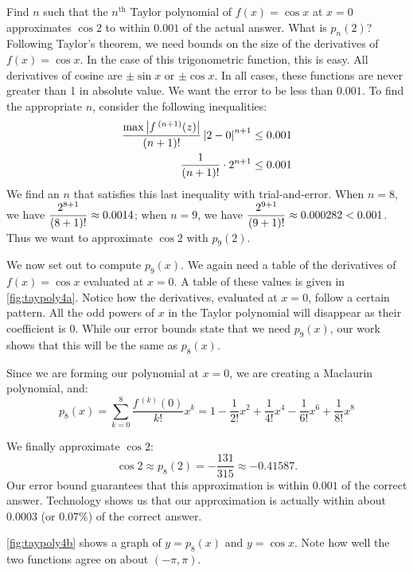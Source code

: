 \begin{example}\label{ex_taypoly4}%
Find $n$ such that the $n^{\text{th}}$ Taylor polynomial of $f(x)=\cos x$ at $x=0$ approximates $\cos 2$ to within $0.001$ of the actual answer. What is $p_n(2)$?
\solution
Following Taylor's theorem, we need bounds on the size of the derivatives of $f(x)=\cos x$. In the case of this trigonometric function, this is easy. All derivatives of cosine are $\pm \sin x$ or $\pm \cos x$. In all cases, these functions are never greater than 1 in absolute value. We want the error to be less than $0.001$. To find the appropriate $n$, consider the following inequalities:
\begin{align*}
\frac{\max\left\lvert f\,^{(n+1)}(z) \right\rvert}{(n+1)!}\left\lvert 2-0 \right\rvert^{n+1} &\leq 0.001 \\
\frac1{(n+1)!}\cdot2^{n+1} &\leq 0.001
\end{align*}
We find an $n$ that satisfies this last inequality with trial-and-error. When $n=8$, we have $\displaystyle \frac{2^{8+1}}{(8+1)!} \approx 0.0014$; when $n=9$, we have $\displaystyle \frac{2^{9+1}}{(9+1)!} \approx 0.000282 <0.001$. Thus we want to approximate $\cos 2$ with $p_9(2)$.\bigskip

We now set out to compute $p_9(x)$. We again need a table of the derivatives of $f(x)=\cos x$ evaluated at $x=0$. A table of these values is given in \autoref{fig:taypoly4a}. Notice how the derivatives, evaluated at $x=0$, follow a certain pattern. All the odd powers of $x$ in the Taylor polynomial will disappear as their coefficient is 0. While our error bounds state that we need $p_9(x)$, our work shows that this will be the same as $p_8(x)$.

Since we are forming our polynomial at $x=0$, we are creating a Maclaurin polynomial, and:\vspace{-.3\baselineskip}
\[
	p_8(x) = \sum_{k=0}^8\frac{f\,^{(k)}(0)}{k!}x^k
	=  1-\frac{1}{2!}x^2+\frac{1}{4!}x^4-\frac{1}{6!}x^6+\frac{1}{8!}x^8
\]

We finally approximate $\cos 2$:
\[\cos 2 \approx p_8(2) = -\frac{131}{315} \approx -0.41587.\]
Our error bound guarantees that this approximation is within $0.001$ of the correct answer. Technology shows us that our approximation is actually within about $0.0003$ (or $0.07\%$) of the correct answer.

\autoref{fig:taypoly4b} shows a graph of $y=p_8(x)$ and $y=\cos x$. Note how well the two functions agree on about $(-\pi,\pi)$.
\end{example}

